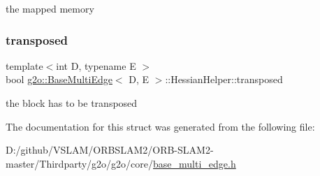 the mapped memory 

\mbox{\label{structg2o_1_1_base_multi_edge_1_1_hessian_helper_aeaff0227a982c30364d97ef9f0d9d60c}} 
\subsubsection{\texorpdfstring{transposed}{transposed}}
{\footnotesize\ttfamily template$<$int D, typename E $>$ \\
bool \mbox{\hyperlink{classg2o_1_1_base_multi_edge}{g2o\+::\+Base\+Multi\+Edge}}$<$ D, E $>$\+::Hessian\+Helper\+::transposed}



the block has to be transposed 



The documentation for this struct was generated from the following file\+:\begin{DoxyCompactItemize}
\item 
D\+:/github/\+V\+S\+L\+A\+M/\+O\+R\+B\+S\+L\+A\+M2/\+O\+R\+B-\/\+S\+L\+A\+M2-\/master/\+Thirdparty/g2o/g2o/core/\mbox{\hyperlink{base__multi__edge_8h}{base\+\_\+multi\+\_\+edge.\+h}}\end{DoxyCompactItemize}

